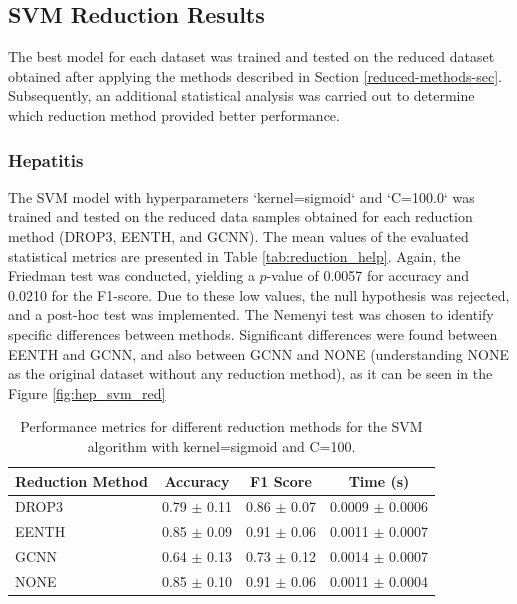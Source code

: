 \subsection{SVM Reduction Results}
The best model for each dataset was trained and tested on the reduced dataset obtained after applying the methods described in Section \ref{reduced-methods-sec}. Subsequently, an additional statistical analysis was carried out to determine which reduction method provided better performance.

\subsubsection{Hepatitis}
The SVM model with hyperparameters `kernel=sigmoid` and `C=100.0` was trained and tested on the reduced data samples obtained for each reduction method (DROP3, EENTH, and GCNN). The mean values of the evaluated statistical metrics are presented in Table \ref{tab:reduction_help}. Again, the Friedman test was conducted, yielding a $p$-value of 0.0057 for accuracy and 0.0210 for the F1-score. Due to these low values, the null hypothesis was rejected, and a post-hoc test was implemented. The Nemenyi test was chosen to identify specific differences between methods. Significant differences were found between EENTH and GCNN, and also between GCNN and NONE (understanding NONE as the original dataset without any reduction method), as it can be seen in the Figure \ref{fig:hep_svm_red} 

\begin{table}[ht]
\centering
\begin{tabular}{|l|c|c|c|}
\hline
\textbf{Reduction Method} & \textbf{Accuracy} & \textbf{F1 Score} & \textbf{Time (s)} \\
\hline
DROP3 & 0.79 $\pm$ 0.11 & 0.86 $\pm$ 0.07 & 0.0009 $\pm$ 0.0006 \\
\hline
EENTH & 0.85 $\pm$ 0.09 & 0.91 $\pm$ 0.06 & 0.0011 $\pm$ 0.0007 \\
\hline
GCNN  & 0.64 $\pm$ 0.13 & 0.73 $\pm$ 0.12 & 0.0014 $\pm$ 0.0007 \\
\hline
NONE  & 0.85 $\pm$ 0.10 & 0.91 $\pm$ 0.06 & 0.0011 $\pm$ 0.0004 \\
\hline
\end{tabular}
\caption{Performance metrics for different reduction methods for the SVM algorithm with kernel=sigmoid and C=100.}
\label{tab:reduction_hep}
\end{table}

